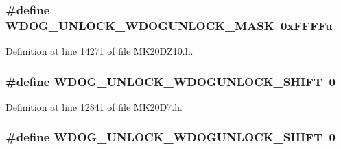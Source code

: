 \subsubsection[{\texorpdfstring{W\+D\+O\+G\+\_\+\+U\+N\+L\+O\+C\+K\+\_\+\+W\+D\+O\+G\+U\+N\+L\+O\+C\+K\+\_\+\+M\+A\+SK}{WDOG_UNLOCK_WDOGUNLOCK_MASK}}]{\setlength{\rightskip}{0pt plus 5cm}\#define W\+D\+O\+G\+\_\+\+U\+N\+L\+O\+C\+K\+\_\+\+W\+D\+O\+G\+U\+N\+L\+O\+C\+K\+\_\+\+M\+A\+SK~0x\+F\+F\+F\+Fu}\hypertarget{group___w_d_o_g___register___masks_gadcf9026f6f2730a765e504ec4c7126a8}{}\label{group___w_d_o_g___register___masks_gadcf9026f6f2730a765e504ec4c7126a8}


Definition at line 14271 of file M\+K20\+D\+Z10.\+h.

\subsubsection[{\texorpdfstring{W\+D\+O\+G\+\_\+\+U\+N\+L\+O\+C\+K\+\_\+\+W\+D\+O\+G\+U\+N\+L\+O\+C\+K\+\_\+\+S\+H\+I\+FT}{WDOG_UNLOCK_WDOGUNLOCK_SHIFT}}]{\setlength{\rightskip}{0pt plus 5cm}\#define W\+D\+O\+G\+\_\+\+U\+N\+L\+O\+C\+K\+\_\+\+W\+D\+O\+G\+U\+N\+L\+O\+C\+K\+\_\+\+S\+H\+I\+FT~0}\hypertarget{group___w_d_o_g___register___masks_ga07ed92839744d67e4c393b00bc293246}{}\label{group___w_d_o_g___register___masks_ga07ed92839744d67e4c393b00bc293246}


Definition at line 12841 of file M\+K20\+D7.\+h.

\subsubsection[{\texorpdfstring{W\+D\+O\+G\+\_\+\+U\+N\+L\+O\+C\+K\+\_\+\+W\+D\+O\+G\+U\+N\+L\+O\+C\+K\+\_\+\+S\+H\+I\+FT}{WDOG_UNLOCK_WDOGUNLOCK_SHIFT}}]{\setlength{\rightskip}{0pt plus 5cm}\#define W\+D\+O\+G\+\_\+\+U\+N\+L\+O\+C\+K\+\_\+\+W\+D\+O\+G\+U\+N\+L\+O\+C\+K\+\_\+\+S\+H\+I\+FT~0}\hypertarget{group___w_d_o_g___register___masks_ga07ed92839744d67e4c393b00bc293246}{}\label{group___w_d_o_g___register___masks_ga07ed92839744d67e4c393b00bc293246}


